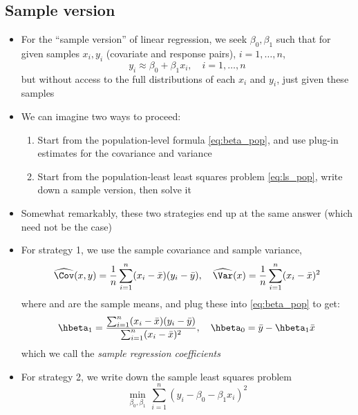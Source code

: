 \documentclass{article}
\begin{document}
\subsection{Sample version}

\begin{itemize}
\item For the ``sample version'' of linear regression, we seek $\beta_0,\beta_1$
  such that for given samples $x_i,y_i$ (covariate and response pairs), $i =
  1,\dots,n$,  
  \[
  y_i \approx \beta_0 + \beta_1 x_i, \quad i = 1,\dots,n
  \]
  but without access to the full distributions of each $x_i$ and $y_i$, just
  given these samples

\item We can imagine two ways to proceed:
  \begin{enumerate}
  \item Start from the population-level formula \eqref{eq:beta_pop}, and use 
    plug-in estimates for the covariance and variance
\item Start from the population-least least squares problem \eqref{eq:ls_pop},
  write down a sample version, then solve it
  \end{enumerate}

\item Somewhat remarkably, these two strategies end up at the same answer
  (which need not be the case)

\item For strategy 1, we use the sample covariance and sample variance, 
  \[
  \widehat{\Cov}(x,y) = \frac{1}{n} \sum_{i=1}^n (x_i - \bar{x}) (y_i -
  \bar{y}), \quad
  \widehat{\Var}(x) = \frac{1}{n} \sum_{i=1}^n (x_i - \bar{x})^2
  \]
  where  and  are the sample means, and plug these into
  \eqref{eq:beta_pop} to get:  
  \begin{equation}
  \label{eq:beta}
  \hbeta_1 = \frac{\sum_{i=1}^n (x_i - \bar{x}) (y_i - \bar{y})} 
  {\sum_{i=1}^n (x_i - \bar{x})^2}, \quad 
  \hbeta_0 = \bar{y} - \hbeta_1 \bar{x}
  \end{equation}
  which we call the \emph{sample regression coefficients}

\item For strategy 2, we write down the sample least squares problem   
  \begin{equation}
  \label{eq:ls}
  \min_{\beta_0, \beta_1} \, \sum_{i=1}^n (y_i - \beta_0 - \beta_1 x_i)^2 
  \end{equation}
  

\end{itemize}
\end{document}
